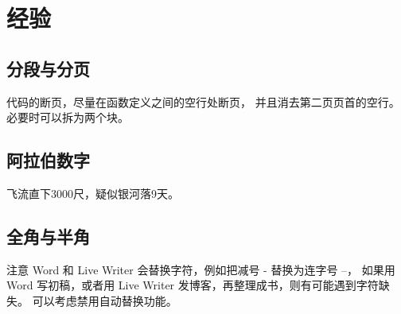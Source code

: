 \chapter{经验}

\section{分段与分页}



代码的断页，尽量在函数定义之间的空行处断页，
并且消去第二页页首的空行。必要时可以拆为两个块。

\section{阿拉伯数字}

飞流直下3000尺，疑似银河落9天。

\section{全角与半角}

注意 Word 和 Live Writer 会替换字符，例如把减号 - 替换为连字号 --，
如果用 Word 写初稿，或者用 Live Writer 发博客，再整理成书，则有可能遇到字符缺失。
可以考虑禁用自动替换功能。

